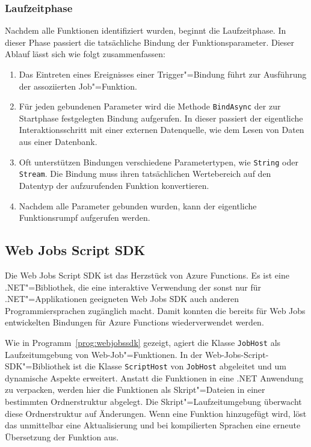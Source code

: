 \subsubsection{Laufzeitphase}

Nachdem alle Funktionen identifiziert wurden, beginnt die Laufzeitphase. In dieser Phase passiert die tatsächliche Bindung der Funktionsparameter. Dieser Ablauf lässt sich wie folgt zusammenfassen:

\begin{enumerate}
	\item Das Eintreten eines Ereignisses einer Trigger"=Bindung führt zur Ausführung der assoziierten Job"=Funktion.
	\item Für jeden gebundenen Parameter wird die Methode \lstinline{BindAsync} der zur Startphase festgelegten Bindung aufgerufen. In dieser passiert der eigentliche Interaktionsschritt mit einer externen Datenquelle, wie \zB dem Lesen von Daten aus einer Datenbank.
	\item Oft unterstützen Bindungen verschiedene Parametertypen, wie \zB \lstinline{String} oder \lstinline{Stream}. Die Bindung muss ihren tatsächlichen Wertebereich auf den Datentyp der aufzurufenden Funktion konvertieren.
	\item Nachdem alle Parameter gebunden wurden, kann der eigentliche Funktionsrumpf aufgerufen werden.
\end{enumerate}

\subsection{Web Jobs Script SDK}
\label{subsec:webjobsscriptsdk}

Die Web Jobs Script SDK ist das Herzstück von Azure Functions. Es ist eine .NET"=Bibliothek, die eine interaktive Verwendung der sonst nur für .NET"=Applikationen geeigneten Web Jobs SDK auch anderen Programmiersprachen zugänglich macht. Damit konnten die bereits für Web Jobs entwickelten Bindungen für Azure Functions wiederverwendet werden.

Wie in Programm~\ref{prog:webjobssdk} gezeigt, agiert die Klasse \lstinline{JobHost} als Laufzeitumgebung von Web-Job"=Funktionen. In der Web-Jobs-Script-SDK"=Bibliothek ist die Klasse \lstinline{ScriptHost} von \lstinline{JobHost} abgeleitet und um dynamische Aspekte erweitert. Anstatt die Funktionen in eine .NET Anwendung zu verpacken, werden hier die Funktionen als Skript"=Dateien in einer bestimmten Ordnerstruktur abgelegt. Die Skript"=Laufzeitumgebung überwacht diese Ordnerstruktur auf Änderungen. Wenn eine Funktion hinzugefügt wird, löst das unmittelbar eine Aktualisierung und bei kompilierten Sprachen eine erneute Übersetzung der Funktion aus.


